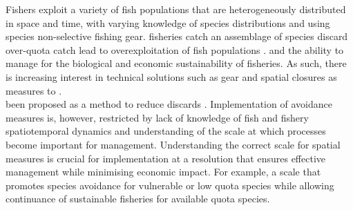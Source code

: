 \documentclass[review]{elsarticle}
\begin{document}
Fishers exploit a variety of fish populations that are heterogeneously
distributed in space and time, with varying knowledge of species distributions
and using species non-selective fishing gear. 
fisheries catch an assemblage of species
 
discard over-quota catch 
lead to overexploitation of fish populations .  
and the ability to manage for
the biological and economic sustainability of fisheries. As such, there
is increasing interest in technical solutions such as gear and spatial closures
as measures to  \citep{Kennelly2002, Catchpole2008,
	Bellido2011, Cosgrove2019}.  \\

 been proposed as a method to reduce discards
.  
Implementation of avoidance measures is, however, restricted by lack of
knowledge of fish and fishery spatiotemporal dynamics and understanding of the
scale at which processes become important for management. Understanding the
correct scale for spatial measures is crucial for implementation at a
resolution that ensures effective management \citep{Dunn2016} while minimising
economic impact.  For example, a scale that promotes species avoidance for
vulnerable or low quota species while allowing continuance of sustainable
fisheries for available quota species.\\
\end{document}
